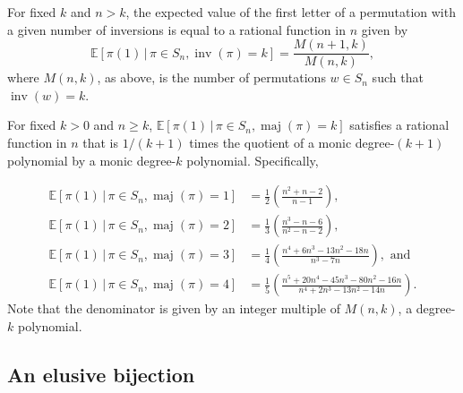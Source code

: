 \begin{conjecture}
  For fixed $k$ and $n > k$, the expected value of the first letter of a
  permutation with a given number of inversions is equal to a rational function
  in $n$ given by \begin{equation}
    \mathbb{E}[\pi(1)\, |\, \pi \in S_n, \operatorname{inv}(\pi) = k]
    = \frac{M(n+1,k)}{M(n,k)},
  \end{equation} where $M(n,k)$, as above, is the number of permutations $w \in S_n$ such
  that $\operatorname{inv}(w) = k$.
\end{conjecture}

\begin{conjecture}
  For fixed $k > 0$ and $n \geq k$,
  $\mathbb{E}[\pi(1)\, |\, \pi \in S_n, \operatorname{maj}(\pi) = k]$
  satisfies a rational function in $n$ that is $1/(k+1)$ times the quotient of a monic
  degree-$(k+1)$ polynomial by a monic degree-$k$ polynomial. Specifically,

  \begin{align}
    \mathbb{E}[\pi(1)\, |\, \pi \in S_n, \operatorname{maj}(\pi) = 1] &= \frac{1}{2}\left(\frac{n^2 + n - 2}{n-1}\right),
    \\[2mm]
    \mathbb{E}[\pi(1)\, |\, \pi \in S_n, \operatorname{maj}(\pi) = 2] &= \frac{1}{3}\left(\frac{n^3 - n - 6}{n^2 - n - 2}\right),
    \\[2mm]
    \mathbb{E}[\pi(1)\, |\, \pi \in S_n, \operatorname{maj}(\pi) = 3] &= \frac{1}{4}\left(\frac{n^4 + 6 n^3 - 13 n^2 - 18 n}{n^3 - 7n}\right),
    \text{ and}
    \\[2mm]
    \mathbb{E}[\pi(1)\, |\, \pi \in S_n, \operatorname{maj}(\pi) = 4] &= \frac{1}{5}\left(\frac{n^5 + 20 n^4 - 45 n^3 - 80 n^2 - 16 n}{n^4 + 2 n^3 - 13 n^2 - 14 n}\right).
  \end{align}
  Note that the denominator is given by an integer multiple of $M(n,k)$,
  a degree-$k$ polynomial.
\end{conjecture}

\subsection{An elusive bijection}

